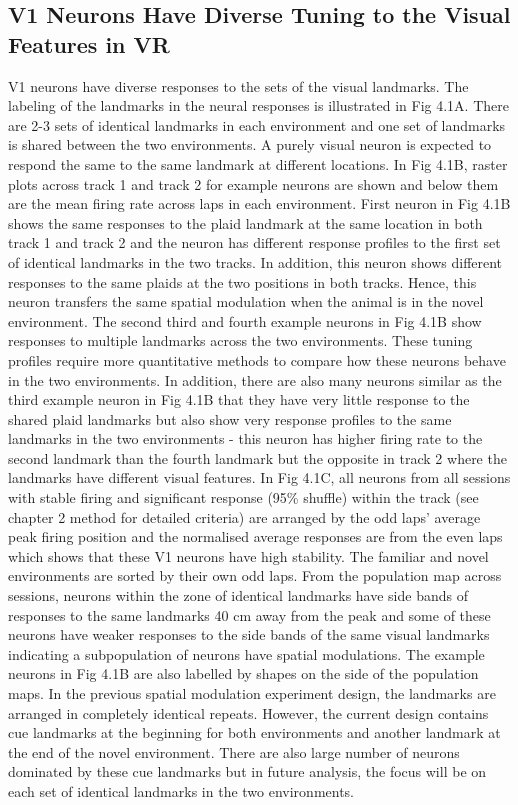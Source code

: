 \subsection{V1 Neurons Have Diverse Tuning to the Visual Features in VR}
V1 neurons have diverse responses to the sets of the visual landmarks. The labeling of the landmarks in the neural responses is illustrated in Fig 4.1A. There are 2-3 sets of identical landmarks in each environment and one set of landmarks is shared between the two environments. A purely visual neuron is expected to respond the same to the same landmark at different locations. In Fig 4.1B, raster plots across track 1 and track 2 for example neurons are shown and below them are the mean firing rate across laps in each environment. First neuron in Fig 4.1B shows the same responses to the plaid landmark at the same location in both track 1 and track 2 and the neuron has different response profiles to the first set of identical landmarks in the two tracks. In addition, this neuron shows different responses to the same plaids at the two positions in both tracks. Hence, this neuron transfers the same spatial modulation when the animal is in the novel environment. The second third and fourth example neurons in Fig 4.1B show responses to multiple landmarks across the two environments. These tuning profiles require more quantitative methods to compare how these neurons behave in the two environments. In addition, there are also many neurons similar as the third example neuron in Fig 4.1B that they have very little response to the shared plaid landmarks but also show very response profiles to the same landmarks in the two environments - this neuron has higher firing rate to the second landmark than the fourth landmark but the opposite in track 2 where the landmarks have different visual features. In Fig 4.1C, all neurons from all sessions with stable firing and significant response (95\% shuffle) within the track (see chapter 2 method for detailed criteria) are arranged by the odd laps' average peak firing position and the normalised average responses are from the even laps which shows that these V1 neurons have high stability. The familiar and novel environments are sorted by their own odd laps. From the population map across sessions, neurons within the zone of identical landmarks have side bands of responses to the same landmarks 40 cm away from the peak and some of these neurons have weaker responses to the side bands of the same visual landmarks indicating a subpopulation of neurons have spatial modulations. The example neurons in Fig 4.1B are also labelled by shapes on the side of the population maps. In the previous spatial modulation experiment design, the landmarks are arranged in completely identical repeats. However, the current design contains cue landmarks at the beginning for both environments and another landmark at the end of the novel environment. There are also large number of neurons dominated by these cue landmarks but in future analysis, the focus will be on each set of identical landmarks in the two environments. 
